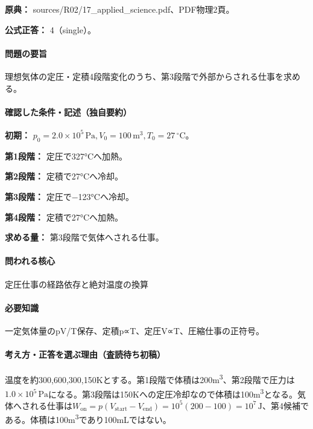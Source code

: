 \noindent\textbf{原典：} sources/R02/17\_applied\_science.pdf、PDF物理2頁。

\textbf{公式正答：} 4（single）。

\paragraph{問題の要旨} 理想気体の定圧・定積4段階変化のうち、第3段階で外部からされる仕事を求める。

\paragraph{確認した条件・記述（独自要約）}\mbox{}\par

\noindent\textbf{初期：} \(p_0=2.0\times10^5\,\mathrm{Pa},V_0=100\,\mathrm{m}^3,T_0=27\,{}^\circ\mathrm{C}\)。\par

\noindent\textbf{第1段階：} 定圧で327°Cへ加熱。\par

\noindent\textbf{第2段階：} 定積で27°Cへ冷却。\par

\noindent\textbf{第3段階：} 定圧で−123°Cへ冷却。\par

\noindent\textbf{第4段階：} 定積で27°Cへ加熱。\par

\noindent\textbf{求める量：} 第3段階で気体へされる仕事。\par

\paragraph{問われる核心} 定圧仕事の経路依存と絶対温度の換算

\paragraph{必要知識} 一定気体量のpV/T保存、定積p∝T、定圧V∝T、圧縮仕事の正符号。

\paragraph{考え方・正答を選ぶ理由（査読待ち初稿）} 温度を約300,600,300,150Kとする。第1段階で体積は200m\textsuperscript{3}、第2段階で圧力は\(1.0\times10^5\,\mathrm{Pa}\)になる。第3段階は150Kへの定圧冷却なので体積は100m\textsuperscript{3}となる。気体へされる仕事は\(W_{\mathrm{on}}=p(V_{\mathrm{start}}-V_{\mathrm{end}})=10^5(200-100)=10^7\,\mathrm{J}\)、第4候補である。体積は100m\textsuperscript{3}であり100mLではない。

